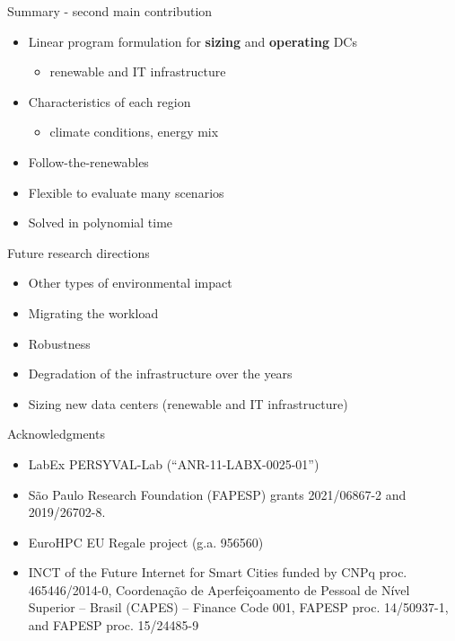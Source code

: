 \documentclass[Ligatures=TeX,table,svgnames,usetotalslideindicator,compress,10pt,aspectratio=169]{beamer}
\begin{document}
\begin{frame}{Summary - second main contribution}

  \begin{itemize}    
  \item Linear program formulation for \textbf{sizing} and \textbf{operating} DCs 
  \begin{itemize}    
    \item renewable and IT infrastructure
  \end{itemize}    

  \item Characteristics of each region   
  \begin{itemize}    
    \item climate conditions, energy mix
  \end{itemize}    
  \item Follow-the-renewables
  \item Flexible to evaluate many scenarios
  \item Solved in polynomial time  
  \end{itemize}    
\end{frame}

\begin{frame}{Future research directions}
  \begin{itemize}
  \item Other types of environmental impact      
  \item Migrating the workload  
  \item Robustness  
  \item Degradation of the infrastructure over the years
  \item Sizing new data centers (renewable and IT infrastructure)  
  \end{itemize}     
\end{frame}

\begin{frame}{Acknowledgments}
  \begin{itemize}
  \item LabEx PERSYVAL-Lab (``ANR-11-LABX-0025-01'')
  \item São Paulo Research Foundation (FAPESP) grants 2021/06867-2 and 2019/26702-8.
   \item EuroHPC EU Regale project (g.a. 956560)
   \item INCT of the Future Internet for Smart Cities funded by CNPq proc. 465446/2014-0, Coordenação de Aperfeiçoamento de Pessoal de Nível Superior – Brasil (CAPES) – Finance Code 001, FAPESP proc. 14/50937-1, and FAPESP proc. 15/24485-9
  \end{itemize}     
\end{frame}
\end{document}

